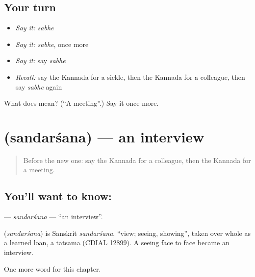 \subsection*{Your turn}
\begin{itemize}
\raggedright
  \item \emph{Say it:} \emph{sabhe}
  \item \emph{Say it:} \emph{sabhe}, once more
  \item \emph{Say it:} say \emph{sabhe}
  \item \emph{Recall:} say the Kannada for a sickle, then the Kannada for a colleague, then say \emph{sabhe} again
\end{itemize}

\begin{tcolorbox}[breakable,colback=teal!4,colframe=teal!35!black,title={Before you move on}]
What does  mean? (\textquotedblleft{}A meeting\textquotedblright{}.) Say it once more.
\end{tcolorbox}
\section[\texorpdfstring{\kn{ಸಂದರ್ಶನ} (sandarśana)}{ಸಂದರ್ಶನ (sandarśana)}]{ (sandarśana) — an interview}

\label{lesson:KA-C231-sandarsana}



\begin{quote}
Before the new one: say the Kannada for a colleague, then the Kannada for a meeting.
\end{quote}

\subsection*{You'll want to know: }
\textbf{} — \emph{sandarśana} — \textquotedblleft{}an interview\textquotedblright{}.

\begin{cousinweb}
\textbf{} (\emph{sandarśana}) is Sanskrit \emph{sandarśana}, \textquotedblleft{}view; seeing, showing\textquotedblright{}, taken over whole as a learned loan, a tatsama (CDIAL 12899). A seeing face to face became an interview.
\end{cousinweb}

\begin{grammarlens}[title={What you've built}]
One more word for this chapter.
\end{grammarlens}

